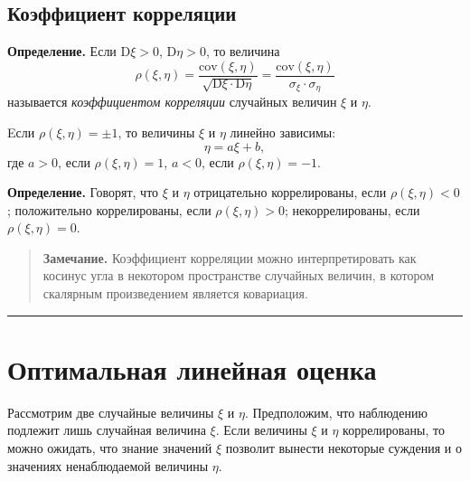 \documentclass[11pt,a4paper]{article}
\begin{document}
    \hypertarget{ux43aux43eux44dux444ux444ux438ux446ux438ux435ux43dux442-ux43aux43eux440ux440ux435ux43bux44fux446ux438ux438}{%
\subsection{Коэффициент
корреляции}\label{ux43aux43eux44dux444ux444ux438ux446ux438ux435ux43dux442-ux43aux43eux440ux440ux435ux43bux44fux446ux438ux438}}

\textbf{Определение.} Если \(\mathrm{D}\xi > 0\),
\(\mathrm{D}\eta > 0\), то величина \[
    \rho(\xi, \eta) = \dfrac{\mathrm{cov}(\xi, \eta)}{\sqrt{\mathrm{D}\xi \cdot \mathrm{D}\eta}} = \dfrac{\mathrm{cov}(\xi, \eta)}{\sigma_\xi \cdot \sigma_\eta}
\] называется \emph{коэффициентом корреляции} случайных величин \(\xi\)
и \(\eta\).

Eсли \(\rho(\xi, \eta) = \pm 1\), то величины \(\xi\) и \(\eta\) линейно
зависимы: \[ \eta =a \xi + b, \] где \(a>0\), если
\(\rho(\xi, \eta) = 1\), \(a<0\), если \(\rho(\xi, \eta) = -1\).

\textbf{Определение.} Говорят, что \(\xi\) и \(\eta\) отрицательно
коррелированы, если \(\rho(\xi, \eta) < 0\); положительно коррелированы,
если \(\rho(\xi, \eta) > 0\); некоррелированы, если
\(\rho(\xi, \eta) = 0\).

\begin{quote}
\textbf{Замечание.} Коэффициент корреляции можно интерпретировать как косинус угла в
некотором пространстве случайных величин, в котором скалярным
произведением является ковариация.
\end{quote}

    \begin{center}\rule{0.5\linewidth}{0.5pt}\end{center}

    \hypertarget{ux43eux43fux442ux438ux43cux430ux43bux44cux43dux430ux44f-ux43bux438ux43dux435ux439ux43dux430ux44f-ux43eux446ux435ux43dux43aux430}{%
\section{Оптимальная линейная
оценка}\label{ux43eux43fux442ux438ux43cux430ux43bux44cux43dux430ux44f-ux43bux438ux43dux435ux439ux43dux430ux44f-ux43eux446ux435ux43dux43aux430}}

Рассмотрим две случайные величины \(\xi\) и \(\eta\). Предположим, что
наблюдению подлежит лишь случайная величина \(\xi\). Если величины
\(\xi\) и \(\eta\) коррелированы, то можно ожидать, что знание значений
\(\xi\) позволит вынести некоторые суждения и о значениях ненаблюдаемой
величины \(\eta\).
\end{document}
